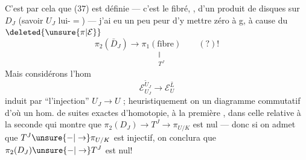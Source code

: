 C'est par cela que (37) est définie --- c'est le  fibré, , d'un produit de disques sur $D_J$ (savoir $U_J$ lui-$=$) --- j'ai eu un peu peur d'y mettre  zéro à g, à cause du $\deleted{\unsure{\pi|\mathcal E}}$
\[
\pi_2(\bar D_J)\longrightarrow
\underset{\substack{\Vert\\ T^J}}{\pi_1(\text{fibre})}
\qquad (?)!
\]
Mais considérons l'hom
\[
\mathcal E_{U_J}^{\tilde U_J}\longrightarrow\mathcal E_U^{\bar L}
\]
induit par ``l'injection'' $U_J\longrightarrow U$ ;  heuristiquement on  un diagramme  commutatif
d'où un hom. de suites exactes d'homotopie,  à la première , dans celle relative à la seconde
qui montre que  $\pi_2(D_J)\longrightarrow T^J\longrightarrow\pi_{U/K}$ est nul --- donc si on admet que $T^J\unsure{-|\to}\pi_{U/K}$ est injectif, on conclura que $\pi_2(D_J)\unsure{-|\to}T^J$ est nul!

